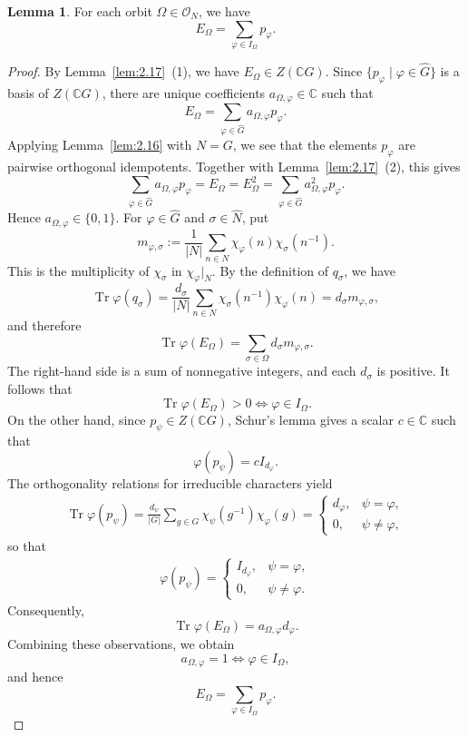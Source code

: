 \documentclass[12pt,a4paper]{article}
\theoremstyle{definition}
\newtheorem{lem}[definition]{Lemma}
\numberwithin{definition}{section}
\DeclareMathOperator{\Tr}{Tr}
\begin{document}
\begin{lem}\label{lem:2.19}
For each orbit $\Omega \in \mathcal{O}_{N}$, we have
\[
E_{\Omega} = \sum_{\varphi \in I_{\Omega}} p_{\varphi}.
\]
\end{lem}
\begin{proof}
By Lemma~\ref{lem:2.17}~(1), we have $E_\Omega\in Z(\mathbb C G)$.
Since $\{p_\varphi\mid\varphi\in\widehat G\}$ is a basis of $Z(\mathbb{C}G)$,
there are unique coefficients $a_{\Omega, \varphi} \in \mathbb{C}$ such that
\[
E_{\Omega} = \sum_{\varphi \in \widehat{G}} a_{\Omega, \varphi} p_{\varphi}.
\]
Applying Lemma~\ref{lem:2.16} with $N = G$, we see that the elements $p_\varphi$ are pairwise orthogonal idempotents.
Together with Lemma~\ref{lem:2.17}~(2), this gives
\[
\sum_{\varphi \in \widehat{G}} a_{\Omega, \varphi} p_{\varphi} = E_{\Omega} = E_{\Omega}^{2} = \sum_{\varphi \in \widehat{G}} a_{\Omega, \varphi}^{2} p_{\varphi}.
\]
Hence $a_{\Omega, \varphi} \in \{ 0, 1 \}$.
For $\varphi \in \widehat{G}$ and $\sigma \in \widehat{N}$, put
\[
m_{\varphi, \sigma} := \dfrac{1}{|N|} \sum_{n \in N} \chi_{\varphi}(n) \chi_{\sigma}(n^{-1}).
\]
This is the multiplicity of $\chi_{\sigma}$ in $\chi_{\varphi}|_{N}$.
By the definition of $q_{\sigma}$, we have
\[
\Tr{\varphi(q_{\sigma})}
= \frac{d_{\sigma}}{|N|} \sum_{n \in N} \chi_{\sigma}(n^{-1}) \chi_{\varphi}(n)
= d_{\sigma} m_{\varphi, \sigma},
\]
and therefore
\[
\Tr{\varphi(E_{\Omega})} = \sum_{\sigma \in \Omega} d_{\sigma} m_{\varphi, \sigma}.
\]
The right-hand side is a sum of nonnegative integers, and each $d_\sigma$ is positive.
It follows that
\[
\Tr{\varphi(E_{\Omega})} > 0 \iff \varphi \in I_{\Omega}.
\]
On the other hand, since $p_{\psi} \in Z(\mathbb{C}G)$,
Schur's lemma gives a scalar $c \in \mathbb{C}$ such that
\[
\varphi(p_{\psi}) = c I_{d_{\varphi}}.
\]
The orthogonality relations for irreducible characters yield
\begin{align*}
\Tr{\varphi(p_{\psi})}
= \frac{d_{\psi}}{|G|} \sum_{g \in G} \chi_{\psi}(g^{-1}) \chi_{\varphi}(g)
=
\begin{cases}
d_{\varphi}, & \psi = \varphi, \\
0, & \psi \neq \varphi,
\end{cases}
\end{align*}
so that
\begin{align*}
\varphi(p_{\psi})
=
\begin{cases}
I_{d_{\varphi}}, & \psi = \varphi, \\
0, & \psi \neq \varphi.
\end{cases}
\end{align*}
Consequently,
\[
\Tr{\varphi(E_{\Omega})} = a_{\Omega, \varphi} d_{\varphi}.
\]
Combining these observations, we obtain
\[
a_{\Omega, \varphi} = 1 \iff \varphi \in I_{\Omega},
\]
and hence
\[
E_{\Omega} = \sum_{\varphi \in I_{\Omega}} p_{\varphi}.
\]
\end{proof}
\end{document}
